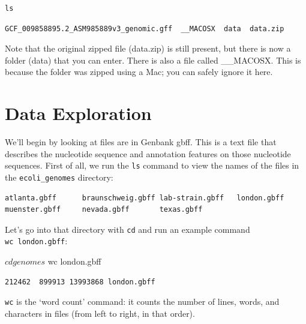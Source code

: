 \documentclass[
]{book}
\newenvironment{Shaded}{\begin{snugshade}}{\end{snugshade}}
\newcommand{\ExtensionTok}[1]{#1}
\newcommand{\NormalTok}[1]{#1}
\begin{document}
\begin{verbatim}
ls 
\end{verbatim}

\begin{verbatim}
GCF_009858895.2_ASM985889v3_genomic.gff  __MACOSX  data  data.zip
\end{verbatim}

Note that the original zipped file (data.zip) is still present, but there is now a folder (data) that you can enter. There is also a file called \_\_MACOSX. This is because the folder was zipped using a Mac; you can safely ignore it here.

\section{Data Exploration}\label{data-exploration}

We'll begin by looking at files are in Genbank gbff. This is a text file that describes the nucleotide sequence and annotation features on those nucleotide sequences. First of all, we run the \texttt{ls} command to view the names of the files in the \texttt{ecoli\_genomes} directory:

\begin{Shaded}
\end{Shaded}

\begin{verbatim}
atlanta.gbff      braunschweig.gbff lab-strain.gbff   london.gbff       muenster.gbff     nevada.gbff       texas.gbff
\end{verbatim}

Let's go into that directory with \texttt{cd} and run an example command \texttt{wc\ london.gbff}:

\begin{Shaded}
\begin{Highlighting}[]
\ExtensionTok{$}\NormalTok{ cd genomes}
\ExtensionTok{$}\NormalTok{ wc london.gbff}
\end{Highlighting}
\end{Shaded}

\begin{verbatim}
212462  899913 13993868 london.gbff
\end{verbatim}

\texttt{wc} is the `word count' command: it counts the number of lines, words, and characters in files (from left to right, in that order).
\end{document}

